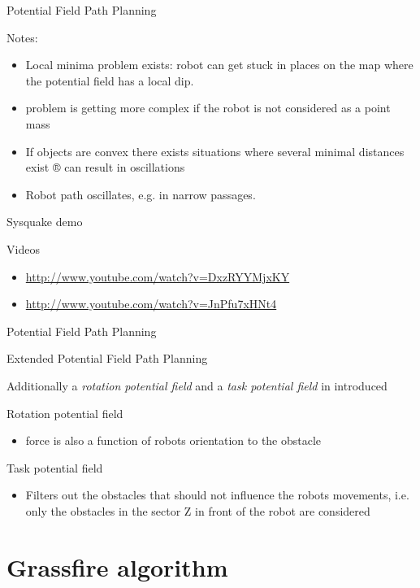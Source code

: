 \documentclass[compress]{beamer}
\begin{document}
\begin{frame}{Potential Field Path Planning}

Notes:

\begin{itemize}
\item Local minima problem exists: robot can get stuck in places on the map
  where the potential field has a local dip.
\item problem is getting more complex if the robot is not considered as a
  point mass
\item If objects are convex there exists situations where several minimal
  distances exist ® can result in oscillations
\item Robot path oscillates, e.g. in narrow passages.
\end{itemize}

Sysquake demo

Videos

\begin{itemize}
\item \url{http://www.youtube.com/watch?v=DxzRYYMjxKY}
\item \url{http://www.youtube.com/watch?v=JnPfu7xHNt4}
\end{itemize}

\end{frame}

\begin{frame}{Potential Field Path Planning}

Extended Potential Field Path Planning

Additionally a \emph{rotation potential field} and a \emph{task
potential field} in introduced

Rotation potential field

\begin{itemize}
\item force is also a function of robots orientation to the obstacle
\end{itemize}

Task potential field

\begin{itemize}
\item Filters out the obstacles that should not influence the robots
  movements, i.e. only the obstacles in the sector Z in front of the
  robot are considered
\end{itemize}

\end{frame}

\section{Grassfire algorithm}
\end{document}
